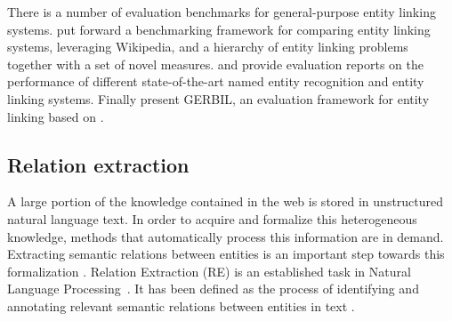 There is a number of evaluation benchmarks for general-purpose entity linking systems. \citep{Cornolti2013} put forward a benchmarking framework for comparing entity linking systems, leveraging Wikipedia, and a hierarchy of entity linking problems together with a set of novel measures. \citep{Rizzo2014} and \citep{Gangemi2013} provide evaluation reports on the performance of different state-of-the-art named entity recognition and entity linking systems. Finally \citep{Usbeck2015} present GERBIL, an evaluation framework for entity linking based on \citep{Cornolti2013}.


\subsection{Relation extraction}
\label{sec:SOA:nlu:relation_extraction}



A large portion of the knowledge contained in the web is stored in unstructured natural language text. In order to acquire and formalize this heterogeneous knowledge, methods that automatically process this information are in demand. Extracting semantic relations between entities is an important step towards this formalization \citep{Wang2008}. Relation Extraction (RE) is an established task in Natural Language Processing~\citep{Bach2007}. It has been defined as the process of identifying and annotating relevant semantic relations between entities in text \citep{JiangZhai2007}. 

